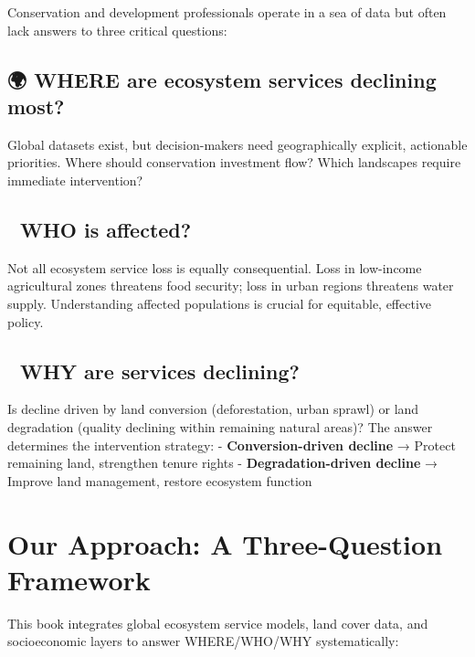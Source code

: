 \documentclass[
  letterpaper,
  DIV=11,
  numbers=noendperiod]{scrreprt}
\begin{document}
Conservation and development professionals operate in a sea of data but
often lack answers to three critical questions:

\subsection{\texorpdfstring{🌍 \textbf{WHERE are ecosystem services
declining
most?}}{🌍 WHERE are ecosystem services declining most?}}\label{where-are-ecosystem-services-declining-most}

Global datasets exist, but decision-makers need geographically explicit,
actionable priorities. Where should conservation investment flow? Which
landscapes require immediate intervention?

\subsection{\texorpdfstring{👥 \textbf{WHO is
affected?}}{👥 WHO is affected?}}\label{who-is-affected}

Not all ecosystem service loss is equally consequential. Loss in
low-income agricultural zones threatens food security; loss in urban
regions threatens water supply. Understanding affected populations is
crucial for equitable, effective policy.

\subsection{\texorpdfstring{🔧 \textbf{WHY are services
declining?}}{🔧 WHY are services declining?}}\label{why-are-services-declining}

Is decline driven by land conversion (deforestation, urban sprawl) or
land degradation (quality declining within remaining natural areas)? The
answer determines the intervention strategy: - \textbf{Conversion-driven
decline} → Protect remaining land, strengthen tenure rights -
\textbf{Degradation-driven decline} → Improve land management, restore
ecosystem function

\section{Our Approach: A Three-Question
Framework}\label{our-approach-a-three-question-framework}

This book integrates global ecosystem service models, land cover data,
and socioeconomic layers to answer WHERE/WHO/WHY systematically:
\end{document}
